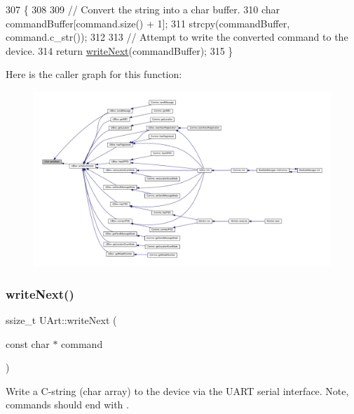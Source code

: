 \begin{DoxyCode}
307 \{
308 
309     \textcolor{comment}{// Convert the string into a char buffer.}
310     \textcolor{keywordtype}{char} commandBuffer[command.size() + 1];
311     strcpy(commandBuffer, command.c\_str());
312 
313     \textcolor{comment}{// Attempt to write the converted command to the device.}
314     \textcolor{keywordflow}{return} \hyperlink{class_u_art_aad1ddb133fe430a92527584eec2e674f}{writeNext}(commandBuffer);
315 \}
\end{DoxyCode}
Here is the caller graph for this function\+:
\nopagebreak
\begin{figure}[H]
\begin{center}
\leavevmode
\includegraphics[width=350pt]{d9/d88/class_u_art_aad1ddb133fe430a92527584eec2e674f_icgraph}
\end{center}
\end{figure}
\mbox{\label{class_u_art_a6353ec5c21b038ca034bacaca8873713}} 
\subsubsection{\texorpdfstring{write\+Next()}{writeNext()}\hspace{0.1cm}{\footnotesize\ttfamily [2/2]}}
{\footnotesize\ttfamily ssize\+\_\+t U\+Art\+::write\+Next (\begin{DoxyParamCaption}\item[{const char $\ast$}]{command }\end{DoxyParamCaption})}

Write a C-\/string (char array) to the device via the U\+A\+RT serial interface. Note, commands should end with .


